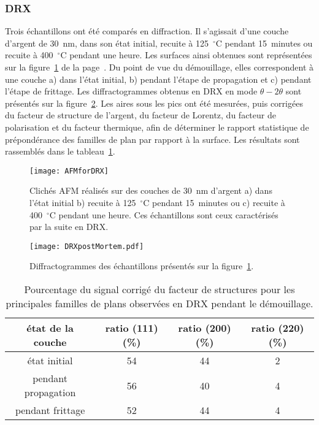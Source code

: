 \subsubsection{DRX}
Trois échantillons ont été comparés en diffraction. Il s'agissait d'une couche d'argent de 30~nm, dans son état initial, recuite à 125~$^\circ$C pendant 15~minutes ou recuite à 400~$^\circ$C pendant une heure. Les surfaces ainsi obtenues sont représentées sur la figure~\ref{AFMforDRX} de la page~\pageref{AFMforDRX}. Du point de vue du démouillage, elles correspondent à une couche a) dans l'état initial, b) pendant l'étape de propagation et c) pendant l'étape de frittage. Les diffractogrammes obtenus en DRX en mode $\theta-2\theta$ sont présentés sur la figure~\ref{DRXpostMortem}. Les aires sous les pics ont été mesurées, puis corrigées du facteur de structure de l'argent, du facteur de Lorentz, du facteur de polarisation et du facteur thermique, afin de déterminer le rapport statistique de prépondérance des familles de plan par rapport à la surface. Les résultats sont rassemblés dans le tableau~\ref{DRXratios}.\par

\begin{figure}[p]
	\centering
	\texttt{[image: AFMforDRX]}
	\caption{Clichés AFM réalisés sur des couches de 30~nm d'argent a) dans l'état initial b) recuite à 125~$^\circ$C pendant 15~minutes ou c) recuite à 400~$^\circ$C pendant une heure. Ces échantillons sont ceux caractérisés par la suite en DRX.}
	\label{AFMforDRX}
\end{figure}

\begin{figure}[p]
	\centering
	\texttt{[image: DRXpostMortem.pdf]}
	\caption{Diffractogrammes des échantillons présentés sur la figure~\ref{AFMforDRX}.}
	\label{DRXpostMortem}
\end{figure}

\begin{table}[p]
	\centering
	\begin{tabular}{cccc}
	\hline
	état de la couche & ratio (111) (\%) & ratio (200) (\%) & ratio (220) (\%)\\
	\hline
	état initial & 54 & 44 & 2\\
	pendant propagation & 56 & 40 & 4\\
	pendant frittage & 52 & 44 & 4\\
	\hline	
	\end{tabular}
	\caption{Pourcentage du signal corrigé du facteur de structures pour les principales familles de plans observées en DRX pendant le démouillage.}
	\label{DRXratios}
\end{table}

